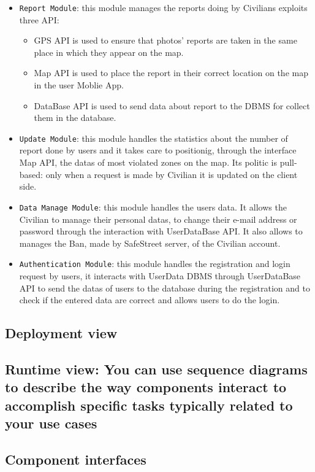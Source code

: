 \documentclass[12pt,a4paper]{article}
\begin{document}
\begin{itemize}
	\item \texttt{Report Module}: this module manages the reports doing by Civilians exploits three API:
	\begin{itemize}
		\item GPS API is used to ensure that photos' reports are taken in the same place in which they appear on the map.
		\item Map API is used to place the report in their correct location on the map in the user Moblie App.
		\item DataBase API is used to send data about report to the DBMS for collect them in the database.
		\end{itemize}
	\item \texttt{Update Module}: this module handles the statistics about the number of report done by users and it takes care to positionig, through the interface Map API, the datas of most violated zones on the map. Its politic is pull-based: only when a request is made by Civilian it is updated on the client side.
	\item \texttt{Data Manage Module}: this module handles the users data. It allows the Civilian to manage their personal datas, to change their e-mail address or password through the interaction with UserDataBase API. It also allows to manages the Ban, made by SafeStreet server, of the Civilian account.
	\item \texttt{Authentication Module}: this module handles the registration and login request by users, it interacts with UserData DBMS through UserDataBase API to send the datas of users to the database during the registration and to check if the entered data are correct and allows users to do the login.
\end{itemize}

\subsection{Deployment view}
\subsection{Runtime view: You can use sequence diagrams to describe the way components interact to accomplish specific tasks typically related to your use cases}
\subsection{Component interfaces}
\end{document}
